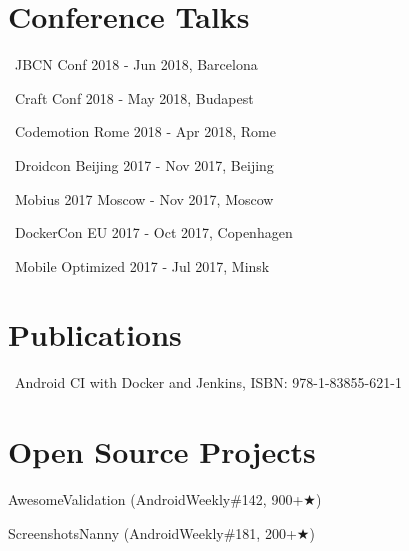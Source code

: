 \documentclass{cv}
\begin{document}
\section*{Conference Talks}

\faMicrophone\ JBCN Conf 2018 - Jun 2018, Barcelona

\faMicrophone\ Craft Conf 2018 - May 2018, Budapest

\faMicrophone\ Codemotion Rome 2018 - Apr 2018, Rome

\faMicrophone\ Droidcon Beijing 2017 - Nov 2017, Beijing

\faMicrophone\ Mobius 2017 Moscow - Nov 2017, Moscow

\faMicrophone\ DockerCon EU 2017 - Oct 2017, Copenhagen

\faMicrophone\ Mobile Optimized 2017 - Jul 2017, Minsk
~\\

\section*{Publications}

\faBook\ Android CI with Docker and Jenkins, ISBN: 978-1-83855-621-1
~\\

\section*{Open Source Projects}

AwesomeValidation (AndroidWeekly\#142, 900+{\DejaVuSans ★})

ScreenshotsNanny (AndroidWeekly\#181, 200+{\DejaVuSans ★})
\end{document}
